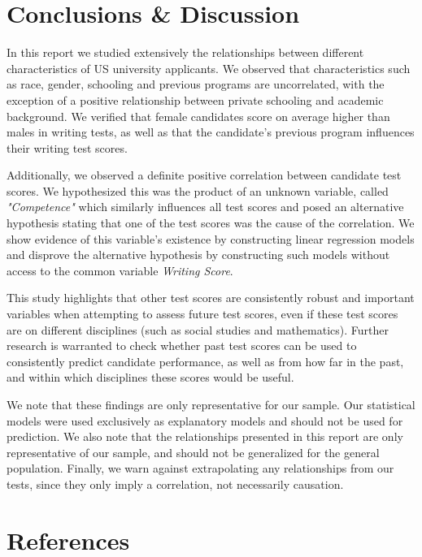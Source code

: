 \documentclass[10pt, a4paper]{article}
\begin{document}
	
	

	
	\section{Conclusions \& Discussion}
	\label{sec::conclusions}
	
	In this report we studied extensively the relationships between different characteristics of US university applicants. We observed that characteristics such as race, gender, schooling and previous programs are uncorrelated, with the exception of a positive relationship between private schooling and academic background. We verified that female candidates score on average higher than males in writing tests, as well as that the candidate's previous program influences their writing test scores. 
	
	Additionally, we observed a definite positive correlation between candidate test scores. We hypothesized this was the product of an unknown variable, called \textit{"Competence"} which similarly influences all test scores and posed an alternative hypothesis stating that one of the test scores was the cause of the correlation. We show evidence of this variable's existence by constructing linear regression models and disprove the alternative hypothesis by constructing such models without access to the common variable \textit{Writing Score}.
	
	This study highlights that other test scores are consistently robust and important variables when attempting to assess future test scores, even if these test scores are on different disciplines (such as social studies and mathematics). Further research is warranted to check whether past test scores can be used to consistently predict candidate performance, as well as from how far in the past, and within which disciplines these scores would be useful.
	
	We note that these findings are only representative for our sample. Our statistical models were used exclusively as explanatory models and should not be used for prediction. We also note that the relationships presented in this report are only representative of our sample, and should not be generalized for the general population. Finally, we warn against extrapolating any relationships from our tests, since they only imply a correlation, not necessarily causation.
	
	
	\section{References}
	\printbibliography[heading=none]
	
\end{document}
